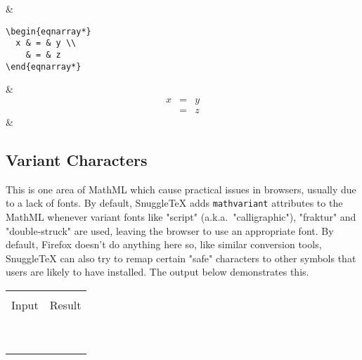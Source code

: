 \begin{ndemotable}
 &  \\

\newcommand{\biginout}[1]{\begin{verbatim}#1\end{verbatim} & #1}
\biginout{\begin{eqnarray*}
  x & = & y \\
    & = & z
\end{eqnarray*}} &
  \\
\end{ndemotable}

\subsection*{Variant Characters}

This is one area of MathML which cause practical issues in browsers, usually due to a lack
of fonts. By default, SnuggleTeX adds \texttt{mathvariant} attributes to the MathML whenever
variant fonts like "script" (a.k.a.\ "calligraphic"), "fraktur" and "double-struck" are used,
leaving the browser to use an appropriate font. By default, Firefox doesn't do anything here
so, like similar conversion tools, SnuggleTeX can also try to remap certain "safe" characters
to other symbols that users are likely to have installed. The output below demonstrates this.

\newcommand{\vcdemo}[1]{\minout{#1{abcdefghijklmnopqrstuvwxyz}} \\ }
\newcommand{\vcudemo}[1]{\minout{#1{ABCDEFGHIJKLMNOPQRSTUVWXYZ}} \\ }
\newenvironment{vctable}
{\begin{center}
 \begin{tabular}{|r|l|}
 \hline \\
 Input & Result \\
 \hline \\
}{\hline
 \end{tabular}
 \end{center}
}
\begin{vctable}
\vcdemo{\mathcal}
\vcudemo{\mathcal}
\vcdemo{\mathsc}
\vcudemo{\mathsc}
\vcdemo{\mathbb}
\vcudemo{\mathbb}
\vcdemo{\mathfrak}
\vcudemo{\mathfrak}
\end{vctable}

